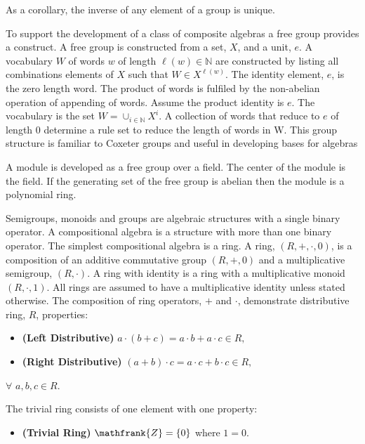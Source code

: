 \documentclass[aps,twocolumn,secnumarabic,nobalancelastpage,amsmath,amssymb,
amsthm,nofootinbib,parskip=full]{revtex4}
\begin{document}
As a corollary, the inverse of any element of a group is unique.

To support the development of a class of composite algebras a
free group provides a construct.
A free group is constructed from a set, $X$, and a unit, $e$.
A vocabulary $W$ of words $w$ of length $\ell(w)\in\mathbb{N}$ are constructed
by listing all combinations elements of $X$ such that $W\in X^{\ell(w)}$.
The identity element, $e$, is the zero length word.
The product of words is fulfiled by the non-abelian operation of 
appending of words.
Assume the product identity is $e$.
The vocabulary is the set $W={\cup}_{i\in\mathbb{N}}X^i$.
A collection of words that reduce to $e$ of length 0 determine a rule set
to reduce the length of words in W. 
This group structure is familiar to Coxeter groups and
useful in developing bases for algebras

A module is developed as a free group over a field. The center of the module
is the field.
If the generating set of the free group is abelian then the module is a polynomial ring. 

Semigroups, monoids and groups are algebraic structures 
with a single binary operator.
A compositional algebra is a structure with more than one 
binary operator. 
The simplest compositional algebra is a ring.
A ring, $(R,+,\cdot,0)$, is a composition of an 
additive commutative group $(R,+,0)$
and a multiplicative semigroup, $(R,\cdot)$.
A ring with identity is a ring with a 
multiplicative monoid $(R,\cdot,1)$.
All rings are assumed to have a multiplicative identity 
unless stated otherwise.
The composition of ring operators, $+$ and $\cdot$, 
demonstrate distributive ring, $R$, properties:

\begin{itemize}
\item \textbf{\small (Left Distributive)}
  $a\cdot(b + c)=a\cdot b+a\cdot c\in R,$
\item \textbf{\small (Right Distributive)}
  $(a+b)\cdot c=a\cdot c+b\cdot c\in R,$
\end{itemize}

\begin{center}
  $\forall$ $a,b,c\in R$.
\end{center}

The trivial ring consists of one element with one property:

\begin{itemize}
\item \textbf{(\small Trivial Ring)} $\mathfrank{Z}=\{0\}$ where $1=0$.
\end{itemize}
\end{document}
